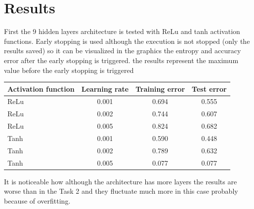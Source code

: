 \documentclass[11pt]{article} %
\begin{document}
\section{Results}
First the 9 hidden layers architecture is tested with ReLu and tanh activation functions. Early stopping is used although the execution is not stopped (only the results saved) 
so it can be visualized in the graphics the entropy and accuracy error after the early stopping is triggered. the results represent the maximum value before the early stopping 
is triggered
\begin{table}[H]
\centering
\begin{tabular}{|l|c|c|c|}
\hline
Activation function & Learning rate & Training error & Test error \\
 \hline
 \hline
ReLu & 0.001 & 0.694 &0.555 \\
 \hline
ReLu & 0.002 & 0.744 &0.607 \\
 \hline
ReLu & 0.005 & 0.824 &0.682 \\
\hline
Tanh & 0.001 & 0.590 &0.448 \\
 \hline
Tanh & 0.002 & 0.789 & 0.632 \\
 \hline
Tanh & 0.005 & 0.077 &0.077 \\ 
\hline
\end{tabular}
\end{table}
It is noticeable how although the architecture has more layers the results are worse than in the Task 2 and they fluctuate much more in this case probably because of overfitting.
\end{document}
